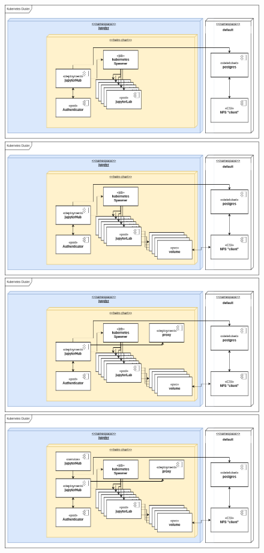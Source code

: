 \documentclass[10pt,brazil]{beamer}
\theoremstyle{definition}
\begin{document}
\begin{frame}[plain]
\begin{figure}
\begin{center}
\begin{overprint}
      \includegraphics[width=1\textwidth]{deploy-jupy-8.png}
      \includegraphics[width=1\textwidth]{deploy-jupy-9.png}
      \includegraphics[width=1\textwidth]{deploy-jupy-10.png}
      \includegraphics[width=1\textwidth]{deploy-jupy-11.png}

\end{overprint}
\end{center}
\end{figure}
\end{frame}
\end{document}
